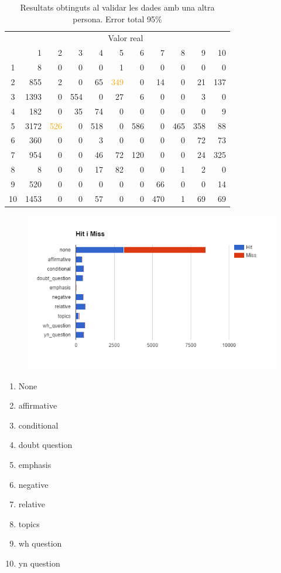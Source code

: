 \documentclass[a4paper]{article}
\begin{document}
\begin{table}[H]
	\centering
	\begin{tabular}{c|rrrrrrrrrr}
		& \multicolumn{10}{c}{Valor real} \\
		& 1 & 2 & 3 & 4 & 5 & 6 & 7 & 8 & 9 & 10 \\
		\hline
		1 & 8 & 0 & 0 & 0 & 1 & 0 & 0 & 0 & 0 & 0\\
		2 & 855 & 2 & 0 & 65 & \textcolor{Orange}{349} & 0 & 14 & 0 & 21 & 137\\
		3 & 1393 & 0 & 554 & 0 & 27 & 6 & 0 & 0 & 3 & 0\\
		4 & 182 & 0 & 35 & 74 & 0 & 0 & 0 & 0 & 0 & 9\\
		5 & 3172 & \textcolor{Orange}{526} & 0 & 518 & 0 & 586 & 0 & 465 & 358 & 88\\
		6 & 360 & 0 & 0 & 3 & 0 & 0 & 0 & 0 & 72 & 73\\
		7 & 954 & 0 & 0 & 46 & 72 & 120 & 0 & 0 & 24 & 325\\
		8 & 8 & 0 & 0 & 17 & 82 & 0 & 0 & 1 & 2 & 0\\
		9 & 520 & 0 & 0 & 0 & 0 & 0 & 66 & 0 & 0 & 14\\
		10 & 1453 & 0 & 0 & 57 & 0 & 0 & 470 & 1 & 69 & 69\\
	\end{tabular}
	\caption{Resultats obtinguts al validar les dades amb una altra persona. Error total 95\%}
\end{table}

\begin{figure}[H]
	\centering
	\includegraphics[width=\textwidth]{images/image01}
\end{figure}

\begin{enumerate}
	\item None 
	\item affirmative 
	\item conditional 
	\item doubt question 
	\item emphasis 
	\item negative 
	\item relative 
	\item topics 
	\item wh question 
	\item yn question
\end{enumerate}
\end{document}
